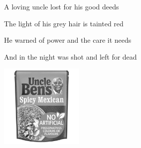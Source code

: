A loving uncle lost for his good deeds

The light of his grey hair is tainted red

He warned of power and the care it needs

And in the night was shot and left for dead

\centering
\includegraphics[width=0.3\textwidth,keepaspectratio]
{img/ben1.jpg}
